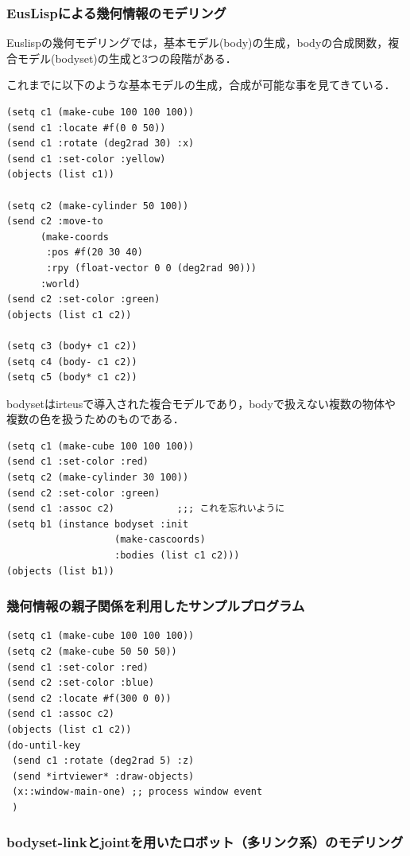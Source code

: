 \subsubsection{EusLispによる幾何情報のモデリング}

Euslispの幾何モデリングでは，基本モデル(body)の生成，bodyの合成関数，複
合モデル(bodyset)の生成と3つの段階がある．

これまでに以下のような基本モデルの生成，合成が可能な事を見てきている．
{\baselineskip=10pt
\begin{verbatim}
(setq c1 (make-cube 100 100 100))
(send c1 :locate #f(0 0 50))
(send c1 :rotate (deg2rad 30) :x)
(send c1 :set-color :yellow)
(objects (list c1))

(setq c2 (make-cylinder 50 100))
(send c2 :move-to
      (make-coords
       :pos #f(20 30 40)
       :rpy (float-vector 0 0 (deg2rad 90)))
      :world)
(send c2 :set-color :green)
(objects (list c1 c2))

(setq c3 (body+ c1 c2))
(setq c4 (body- c1 c2))
(setq c5 (body* c1 c2))
\end{verbatim}
}

bodysetはirteusで導入された複合モデルであり，bodyで扱えない複数の物体や
複数の色を扱うためのものである．

{\baselineskip=10pt
\begin{verbatim}
(setq c1 (make-cube 100 100 100))
(send c1 :set-color :red)
(setq c2 (make-cylinder 30 100))
(send c2 :set-color :green)
(send c1 :assoc c2)           ;;; これを忘れいように
(setq b1 (instance bodyset :init
                   (make-cascoords)
                   :bodies (list c1 c2)))
(objects (list b1))
\end{verbatim}
}

\subsubsection{幾何情報の親子関係を利用したサンプルプログラム}

{\baselineskip=10pt
\begin{verbatim}
(setq c1 (make-cube 100 100 100))
(setq c2 (make-cube 50 50 50))
(send c1 :set-color :red)
(send c2 :set-color :blue)
(send c2 :locate #f(300 0 0))
(send c1 :assoc c2)
(objects (list c1 c2))
(do-until-key
 (send c1 :rotate (deg2rad 5) :z)
 (send *irtviewer* :draw-objects)
 (x::window-main-one) ;; process window event
 )
\end{verbatim}
}

\subsubsection{bodyset-linkとjointを用いたロボット（多リンク系）のモデリング}


